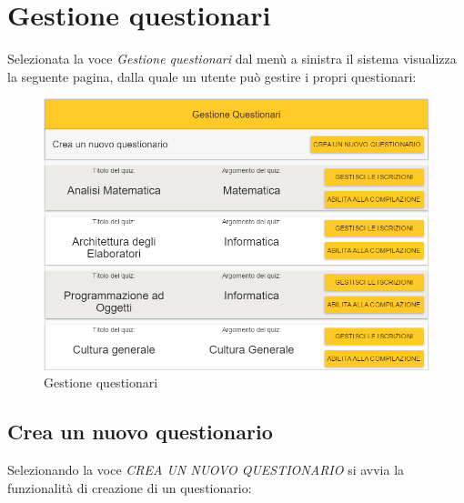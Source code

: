 \newpage
\section{Gestione questionari}
Selezionata la voce \textit{Gestione questionari} dal menù a sinistra il sistema visualizza la seguente pagina, dalla quale un utente può gestire i propri questionari:

\label{GestioneQuestionari}
\begin{figure}[ht]
	\centering
	\includegraphics[scale=0.55]{img/gestione_questionari.png}
	\caption{Gestione questionari}
\end{figure}
\FloatBarrier

\newpage
\subsection{Crea un nuovo questionario}
Selezionando la voce \textit{CREA UN NUOVO QUESTIONARIO} si avvia la funzionalità di creazione di un questionario:

